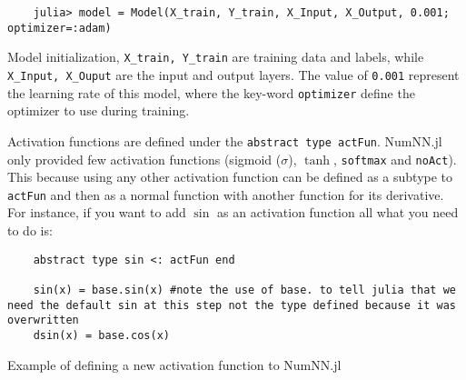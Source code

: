 \begin{listing}[H]
	\begin{verbatim}
	julia> model = Model(X_train, Y_train, X_Input, X_Output, 0.001; optimizer=:adam)
	\end{verbatim}
	\caption{Model initialization, \texttt{X_train, Y_train} are training data and labels, while \texttt{X_Input, X_Ouput} are the input and output layers. The value of \texttt{0.001} represent the learning rate of this model, where the key-word \texttt{optimizer} define the optimizer to use during training.}\label{modelinit}
\end{listing}

Activation functions are defined under the \texttt{abstract type actFun}. NumNN.jl only provided few activation functions (sigmoid ($\sigma$), $\tanh$, \texttt{softmax} and \texttt{noAct}). This because using any other activation function can be defined as a subtype to \texttt{actFun} and then as a normal function with another function for its derivative. For instance, if you want to add $\sin$ as an activation function all what you need to do is:

\begin{listing}[H]
	\begin{verbatim}
	abstract type sin <: actFun end
	
	sin(x) = base.sin(x) #note the use of base. to tell julia that we need the default sin at this step not the type defined because it was overwritten
	dsin(x) = base.cos(x)
	\end{verbatim}
	\caption{Example of defining a new activation function to NumNN.jl}
\end{listing}

